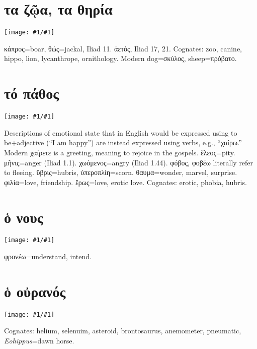 \documentclass[12pt,openany]{book}
\newenvironment{notes}{\vfill\scriptsize\begin{flushright}}{\end{flushright}}
\newcommand{\fig}[1]{\begin{center}\texttt{[image: \#1/\#1]}\end{center}}
\begin{document}

\chapter{τα ζῷα, τα θηρία}

\fig{animals} 

\begin{notes}
κάπρος=boar,  θώς=jackal, Iliad 11.  ἀετός, Iliad 17, 21. Cognates: zoo, canine, hippo, lion, lycanthrope, ornithology.
Modern dog=σκύλος, sheep=πρόβατο. 
\end{notes}


\chapter{τό πάθος}

\fig{emotions}

\begin{notes}
Descriptions of emotional state that in English would be expressed using to be+adjective (``I am happy'') are
instead expressed using verbs, e.g., ``χαίρω.''
Modern χαίρετε is a greeting, meaning to rejoice in the gospels.
ἕλεος=pity. μῆνις=anger (Iliad 1.1). χωόμενος=angry (Iliad 1.44).
φόβος, φοβέω literally refer to fleeing. ὕβρις=hubris, ὑπεροπλίη=scorn.
θαυμα=wonder, marvel, surprise. φιλία=love, friendship. ἕρως=love, erotic love.
Cognates: erotic, phobia, hubris.
\end{notes}


\chapter{ὁ νους}

\fig{mind}

\begin{notes}
φρονέω=understand, intend.
\end{notes}


\chapter{ὁ οὐρανός}

\fig{sky}

\begin{notes}
Cognates: helium, selenuim, asteroid, brontosaurus, anemometer, pneumatic, \emph{Eohippus}=dawn horse.
\end{notes}
\end{document}

